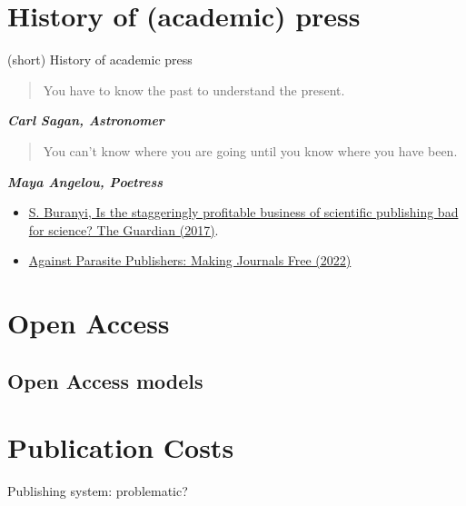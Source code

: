 \documentclass[10pt,compress,serif,aspectratio=169]{beamer}
\begin{document}
\section{History of (academic) press}
\begin{frame}[t]
  \begin{center}
  {\huge (short) History of academic press}\\
\end{center}
\vfill
  \begin{quote}
    You have to know the past to understand the present.
  \end{quote}
  \begin{flushright}\textbf{\textit{Carl Sagan, Astronomer}}
  \end{flushright}
\vfill
  \begin{quote}
    You can't know where you are going until you know where you have been.
  \end{quote}
  \begin{flushright}\textbf{\textit{Maya Angelou, Poetress}}
    \end{flushright} 

  \pause
  \begin{itemize}
    \item 
  \href{https://www.theguardian.com/science/2017/jun/27/profitable-business-scientific-publishing-bad-for-science}{S. Buranyi, Is the staggeringly profitable business of scientific publishing bad for science? The Guardian (2017)}.
  \item
    \href{https://doi.org/10.5281/zenodo.7212922}{Against Parasite Publishers: Making Journals Free (2022)}
\end{itemize}
\end{frame}

\section{Open Access}
\subsection{Open Access models}

\section{Publication Costs}
\begin{frame}[t]{Publishing system: problematic?}
\end{frame}
\end{document}
